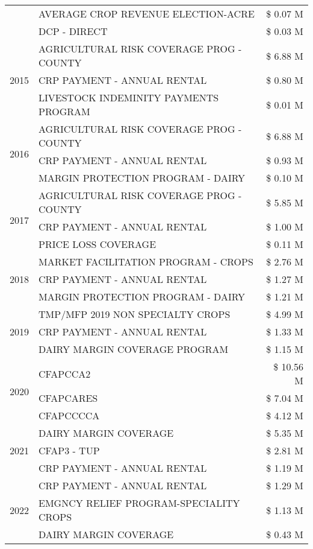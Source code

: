 \begin{tabular}{llr}
 & AVERAGE CROP REVENUE ELECTION-ACRE & \$ 0.07 M \\
 & DCP - DIRECT & \$ 0.03 M \\
\cline{1-3}
\multirow[t]{3}{*}{2015} & AGRICULTURAL RISK COVERAGE PROG - COUNTY & \$ 6.88 M \\
 & CRP PAYMENT - ANNUAL RENTAL & \$ 0.80 M \\
 & LIVESTOCK INDEMINITY PAYMENTS PROGRAM & \$ 0.01 M \\
\cline{1-3}
\multirow[t]{3}{*}{2016} & AGRICULTURAL RISK COVERAGE PROG - COUNTY & \$ 6.88 M \\
 & CRP PAYMENT - ANNUAL RENTAL & \$ 0.93 M \\
 & MARGIN PROTECTION PROGRAM - DAIRY & \$ 0.10 M \\
\cline{1-3}
\multirow[t]{3}{*}{2017} & AGRICULTURAL RISK COVERAGE PROG - COUNTY & \$ 5.85 M \\
 & CRP PAYMENT - ANNUAL RENTAL & \$ 1.00 M \\
 & PRICE LOSS COVERAGE & \$ 0.11 M \\
\cline{1-3}
\multirow[t]{3}{*}{2018} & MARKET FACILITATION PROGRAM - CROPS & \$ 2.76 M \\
 & CRP PAYMENT - ANNUAL RENTAL & \$ 1.27 M \\
 & MARGIN PROTECTION PROGRAM - DAIRY & \$ 1.21 M \\
\cline{1-3}
\multirow[t]{3}{*}{2019} & TMP/MFP 2019 NON SPECIALTY CROPS & \$ 4.99 M \\
 & CRP PAYMENT - ANNUAL RENTAL & \$ 1.33 M \\
 & DAIRY MARGIN COVERAGE PROGRAM & \$ 1.15 M \\
\cline{1-3}
\multirow[t]{3}{*}{2020} & CFAPCCA2 & \$ 10.56 M \\
 & CFAPCARES & \$ 7.04 M \\
 & CFAPCCCCA & \$ 4.12 M \\
\cline{1-3}
\multirow[t]{3}{*}{2021} & DAIRY MARGIN COVERAGE & \$ 5.35 M \\
 & CFAP3 - TUP & \$ 2.81 M \\
 & CRP PAYMENT - ANNUAL RENTAL & \$ 1.19 M \\
\cline{1-3}
\multirow[t]{3}{*}{2022} & CRP PAYMENT - ANNUAL RENTAL & \$ 1.29 M \\
 & EMGNCY RELIEF PROGRAM-SPECIALITY CROPS & \$ 1.13 M \\
 & DAIRY MARGIN COVERAGE & \$ 0.43 M \\
\cline{1-3}
\bottomrule
\end{tabular}
